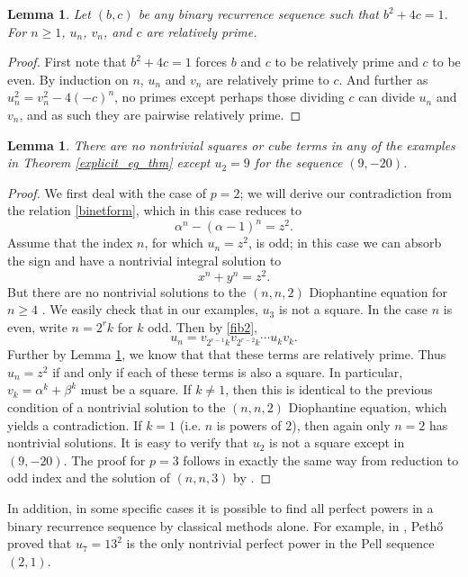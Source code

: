 \documentclass[12pt]{amsart}
\newtheorem{lem}[thm]{Lemma}
\theoremstyle{definition}
\theoremstyle{remark}
\begin{document}
\begin{lem}\label{relprime}
Let $(b,c)$ be any binary recurrence sequence such that $b^2+4c=1$.  For $n \geq 1$,  $u_n$, $v_n$, and $c$ are relatively prime.
\end{lem}

\begin{proof}
First note that $b^2 +4c = 1$ forces $b$ and $c$ to be relatively prime and $c$ to be even.  By induction on $n$, $u_n$ and $v_n$ are relatively prime to $c$.  And further as $u_n^2  = v_n^2 - 4(-c)^n$, no primes except perhaps those dividing $c$ can divide $u_n$ and $v_n$, and as such they are pairwise relatively prime. \end{proof}

\begin{lem}\label{smallp}
There are no nontrivial squares or cube terms in any of the examples in Theorem \ref{explicit_eg_thm} except $u_2 = 9$ for the sequence $(9,-20)$.
\end{lem}

\begin{proof}

We first deal with the case of $p=2$; we will derive our contradiction from the relation \eqref{binetform}, which in this case reduces to
\[ \alpha^n - (\alpha-1)^n = z^2.\]
Assume that the index $n$, for which $u_n = z^2$, is odd; in this case we can absorb the sign and have a nontrivial integral solution to
\[ x^n +y^n = z^2. \]
But there are no nontrivial solutions to the $(n,n,2)$ Diophantine equation for $n \geq 4$  \cite{darmon97}.  We easily check that in our examples, $u_3$ is not a square.  In the case $n$ is even, write $n=2^rk$ for $k$ odd.  Then by \eqref{fib2}, 
\[u_{n} = v_{2^{r-1}k}v_{2^{r-2}k} \cdots u_kv_k.\]  
Further by Lemma \ref{relprime}, we know that that these terms are relatively prime.  Thus $u_n=z^2$ if and only if each of these terms is also a square.  In particular, $v_k = \alpha^k + \beta^k$ must be a square.  If $k \neq 1$, then this is identical to the previous condition of a nontrivial solution to the $(n,n,2)$ Diophantine equation, which yields a contradiction.  If $k = 1$ (i.e. $n$ is powers of $2$), then again only $n=2$ has nontrivial solutions.  It is easy to verify that $u_2$ is not a square except in $(9,-20)$.  The proof for $p=3$ follows in exactly the same way from reduction to odd index and the solution of $(n,n,3)$ by \cite{darmon97}.
\end{proof}

In addition, in some specific cases it is possible to find all perfect powers in a binary recurrence sequence by classical methods alone.  For example, in \cite{petho92}, Peth{\H{o}} proved that $u_7 = 13^2$ is the only nontrivial perfect power in the Pell sequence $(2,1)$.
\end{document}
